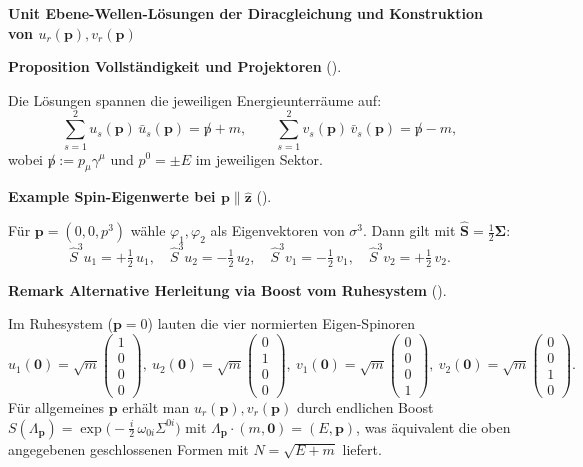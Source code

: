 \documentclass[10pt, letterpaper]{article}
\newcommand{\CustomHeading}[3]{%
  \par\medskip\noindent%
  \textbf{#1 #2} \textnormal{(#3)}.\enskip%
}
\newenvironment{PROP}[2]{\begin{unitbox}\CustomHeading{Proposition}{#1}{#2}}{\end{unitbox}}
\newenvironment{REM}[2]{\begin{unitbox}\CustomHeading{Remark}{#1}{#2}}{\end{unitbox}}
\newenvironment{EXA}[2]{\begin{unitbox}\CustomHeading{Example}{#1}{#2}}{\end{unitbox}}
\newenvironment{unit}[1]
  {\begin{unitbox}\textbf{Unit #1}\par\smallskip}
  {\end{unitbox}}
\begin{document}
\begin{unit}{Ebene-Wellen-Lösungen der Diracgleichung und Konstruktion von $u_r(\mathbf p),v_r(\mathbf p)$}
\begin{PROP}{Vollständigkeit und Projektoren}{}
Die Lösungen spannen die jeweiligen Energieunterräume auf:
\[
\sum_{s=1}^2 u_s(\mathbf p)\,\bar u_s(\mathbf p) = \not p + m,\qquad
\sum_{s=1}^2 v_s(\mathbf p)\,\bar v_s(\mathbf p) = \not p - m,
\]
wobei $\not p:=p_\mu\gamma^\mu$ und $p^0=\pm E$ im jeweiligen Sektor.
\end{PROP}

\begin{EXA}{Spin-Eigenwerte bei $\mathbf p\parallel \hat{\mathbf z}$}{}
Für $\mathbf p=(0,0,p^3)$ wähle $\varphi_1,\varphi_2$ als Eigenvektoren von $\sigma^3$.
Dann gilt mit $\hat{\mathbf S}=\tfrac12\boldsymbol{\Sigma}$:
\[
\hat S^3 u_1=+\tfrac12\,u_1,\quad
\hat S^3 u_2=-\tfrac12\,u_2,\quad
\hat S^3 v_1=-\tfrac12\,v_1,\quad
\hat S^3 v_2=+\tfrac12\,v_2.
\]
\end{EXA}

\begin{REM}{Alternative Herleitung via Boost vom Ruhesystem}{}
Im Ruhesystem ($\mathbf p=0$) lauten die vier normierten Eigen-Spinoren
\[
u_1(\mathbf 0)=\sqrt{m}\begin{pmatrix}1\\0\\0\\0\end{pmatrix},\
u_2(\mathbf 0)=\sqrt{m}\begin{pmatrix}0\\1\\0\\0\end{pmatrix},\
v_1(\mathbf 0)=\sqrt{m}\begin{pmatrix}0\\0\\0\\1\end{pmatrix},\
v_2(\mathbf 0)=\sqrt{m}\begin{pmatrix}0\\0\\1\\0\end{pmatrix}.
\]
Für allgemeines $\mathbf p$ erhält man $u_r(\mathbf p),v_r(\mathbf p)$ durch endlichen Boost
$S(\Lambda_{\mathbf p})=\exp\!\big(-\frac{i}{2}\,\omega_{0i}\Sigma^{0i}\big)$ mit $\Lambda_{\mathbf p}\cdot (m,\mathbf 0)=(E,\mathbf p)$,
was äquivalent die oben angegebenen geschlossenen Formen mit $N=\sqrt{E+m}$ liefert.
\end{REM}

\end{unit}
\end{document}
